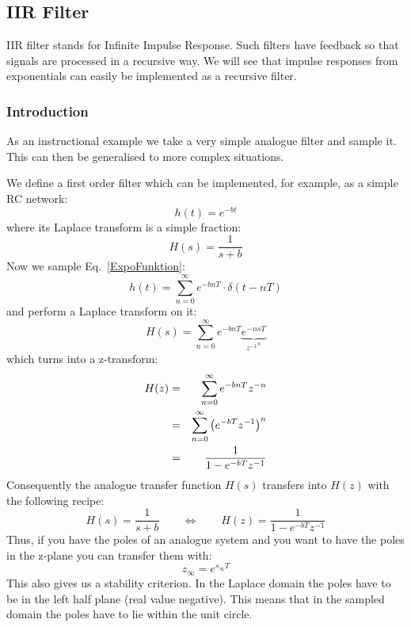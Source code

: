 \documentclass[12pt,a4paper]{article}
\begin{document}
\clearpage
\subsection{IIR Filter}
IIR filter stands for Infinite Impulse Response. Such filters have
feedback so that signals are processed in a recursive way. We will see
that impulse responses from exponentials can easily be implemented as
a recursive filter.

\subsubsection{Introduction}
As an instructional example we take a very simple analogue filter and
sample it. This can then be generalised to more complex
situations.

We define a first order filter which can be implemented, for example, as
a simple RC network:
\begin{equation}
h(t)=e^{-bt}
\label{ExpoFunktion}
\end{equation}
where its Laplace transform is a simple fraction:
\begin{equation}
H(s)=\frac{1}{s+b}
\end{equation}
Now we sample Eq.~\ref{ExpoFunktion}:
\begin{equation}
h(t)=\sum_{n=0}^\infty e^{-bnT} \cdot \delta(t-nT)
\end{equation}
and perform a Laplace transform on it:
\begin{equation}
H(s) = \sum_{n=0}^\infty e^{-bnT} \underbrace{e^{-nsT}}_{{z^{-1}}^n}
\end{equation}
which turns into a z-transform:
\begin{eqnarray}
H(z)&=&\sum_{n=0}^\infty e^{-bnT} z^{-n} \\
    &=&\sum_{n=0}^\infty {\left(e^{-bT} z^{-1}\right)}^n \\
    &=&{1\over 1-e^{-bT} z^{-1}}  \label{IIReq}
\end{eqnarray}
Consequently the analogue transfer function $H(s)$
transfers into $H(z)$ with the following recipe:
\begin{equation}
H(s)=\frac{1}{s+b} \qquad\Leftrightarrow\qquad
H(z)=\frac{1}{1-e^{-bT} z^{-1}} \label{impInv}
\end{equation}
Thus, if you have the poles of an analogue system and you want
to have the poles in the z-plane you can transfer them with:
\begin{equation}
z_\infty=e^{s_\infty T}
\label{translpoles}
\end{equation}
This also gives us a stability criterion. In the Laplace domain
the poles have to be in the left half plane (real value negative).
This means that in the sampled domain the poles have to lie within
the unit circle.
\end{document}
